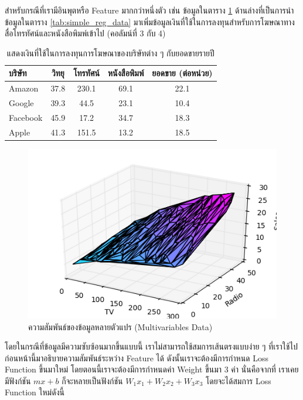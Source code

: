 สำหรับกรณีที่เรามีอินพุตหรือ Feature มากกว่าหนึ่งตัว เช่น ข้อมูลในตาราง \ref{tab:multi_reg_data} ด้านล่างที่เป็นการนำข้อมูลในตาราง 
\ref{tab:simple_reg_data} มาเพิ่มข้อมูลเงินที่ใช้ในการลงทุนสำหรับการโฆษณาทางสื่อโทรทัศน์และหนังสือพิมพ์เข้าไป (คอลัมน์ที่ 3 กับ 4) 

\begin{table}[htbp]
    \centering
    \caption{แสดงเงินที่ใช้ในการลงทุนการโฆษณาของบริษัทต่าง ๆ กับยอดขายรายปี}
    \label{tab:multi_reg_data}
    \begin{tabular}{lcccc}\toprule
    \textbf{บริษัท} &\textbf{วิทยุ} &\textbf{โทรทัศน์} &\textbf{หนังสือพิมพ์} &\textbf{ยอดขาย (ต่อหน่วย)} \\\midrule
    Amazon &37.8 &230.1 &69.1 &22.1 \\
    Google &39.3 &44.5 &23.1 &10.4 \\
    Facebook &45.9 &17.2 &34.7 &18.3 \\
    Apple &41.3 &151.5 &13.2 &18.5 \\
    \bottomrule
    \end{tabular}
\end{table}

\begin{figure}[htbp]
    \centering
    \includegraphics[width=0.8\linewidth]{fig/plot_multivar_reg.png}
    \caption{ความสัมพันธ์ของข้อมูลหลายตัวแปร (Multivariables Data)}
    \label{fig:multi_var_reg}
\end{figure}

โดยในกรณีที่ข้อมูลมีความซับซ้อนมากขึ้นแบบนี้ เราไม่สามารถใช้สมการเส้นตรงแบบง่าย ๆ ที่เราใช้ไปก่อนหน้านี้มาอธิบายความสัมพันธ์ระหว่าง 
Feature ได้ ดังนั้นเราจะต้องมีการกำหนด Loss Function ขึ้นมาใหม่ โดยตอนนี้เราจะต้องมีการกำหนดค่า Weight ขึ้นมา 3 ค่า นั่นคือจากที่%
เราเคยมีฟังก์ชัน $mx + b$ ก็จะหลายเป็นฟังก์ชัน $W_1 x_1 + W_2 x_2 + W_3 x_3$ โดยจะได้สมการ Loss Function ใหม่ดังนี้

